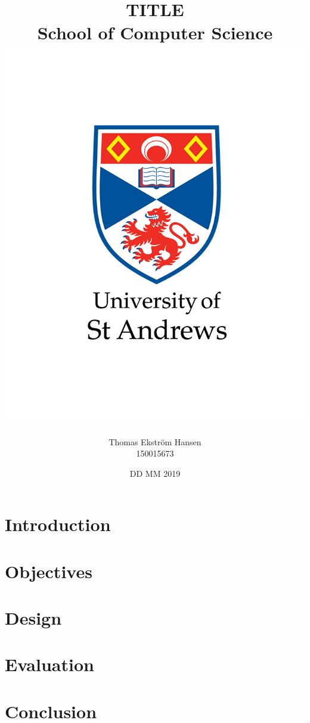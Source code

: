 \documentclass[12pt,twoside]{report}
\title{
    {TITLE}\\
    {\large School of Computer Science}\\
    {\includegraphics[scale=0.3]{uosta/01-standard-vertical-black.png}}
}
\author{
    {Thomas Ekstr{\" o}m Hansen}\\
    {150015673}
}
\date{DD MM 2019}
\begin{document}
    \maketitle
    
    \tableofcontents
    
    \chapter{Introduction}
    
    
    \chapter{Objectives}
    
        
    \chapter{Design}
    
    
    \chapter{Evaluation}
    
        
    \chapter{Conclusion}
    
\end{document}
